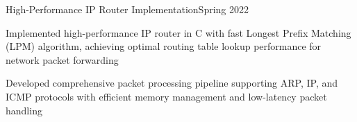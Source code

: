\begin{joblong}{High-Performance IP Router Implementation}{Spring 2022}
	\item Implemented high-performance IP router in C with fast Longest Prefix Matching (LPM) algorithm, achieving optimal routing table lookup performance for network packet forwarding
	\item Developed comprehensive packet processing pipeline supporting ARP, IP, and ICMP protocols with efficient memory management and low-latency packet handling
\end{joblong}
